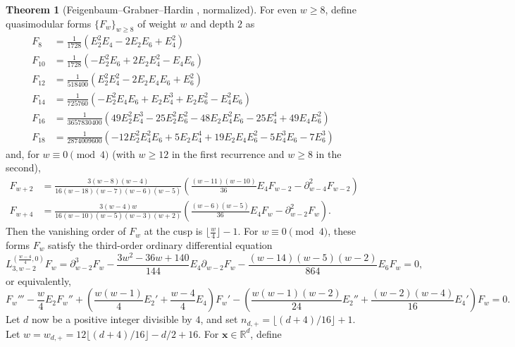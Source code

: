 \documentclass[10pt,reqno]{amsproc}
\newcommand{\1}{\mathds{1}}	%
\theoremstyle{definition}
\newtheorem{theorem}{Theorem}[section]
\theoremstyle{remark}
\begin{document}
\begin{theorem}[Feigenbaum--Grabner--Hardin \cite{feigenbaum2021eigenfunctions}, normalized]
\label{thm:fghposeig}
For even $w \geq 8$, define quasimodular forms $\{F_w\}_{w \geq 8}$ of weight $w$ and depth $2$ as
\begin{align*}
F_{8} &= \frac{1}{1728}(E_2^2 E_4 - 2E_2 E_6 + E_4^2) \\
F_{10} &= \frac{1}{1728}(- E_2^2 E_6 + 2 E_2 E_4^2 - E_4 E_6) \\
F_{12} &= \frac{1}{518400}(E_2^2 E_4^2 - 2 E_2 E_4 E_6 + E_6^2)\\
F_{14} &= \frac{1}{725760}(-E_2^2 E_4 E_6 + E_2 E_4^3 + E_2 E_6^2 - E_4^2 E_6)\\
F_{16} &= \frac{1}{3657830400}(49 E_2^2 E_4^3 - 25 E_2^2 E_6^2 - 48 E_2 E_4^2 E_6 - 25 E_4^4 + 49 E_4 E_6^2)\\
F_{18} &= \frac{1}{2874009600} (-12 E_2^2 E_4^2 E_6 + 5 E_2 E_4^4 + 19 E_2 E_4 E_6^2 - 5 E_4^3 E_6 - 7 E_6^3)
\end{align*}
and, for $w \equiv 0 \pmod{4}$ (with $w \geq 12$ in the first recurrence and $w \geq 8$ in the second),
\begin{align}
    F_{w + 2} &= \frac{3(w-8)(w-4)}{16(w-18)(w-7)(w-6)(w-5)} \left(\frac{(w-11)(w-10)}{36} E_{4} F_{w-2} - \partial_{w-4}^{2} F_{w-2}\right) \label{eqn:poseig2} \\
    F_{w + 4} &= \frac{3(w-4)w}{16(w-10)(w-5)(w-3)(w+2)} \left(\frac{(w-6)(w-5)}{36} E_{4} F_{w} - \partial_{w-2}^{2} F_{w} \right).\label{eqn:poseig4}
\end{align}
Then the vanishing order of $F_{w}$ at the cusp is $\lfloor \frac{w}{4}\rfloor - 1$.
For $w \equiv 0\pmod{4}$, these forms $F_w$ satisfy the third-order ordinary differential equation
\begin{equation}
    L_{3,w-2}^{(\frac{w-4}{4},0)} F_w = \partial_{w-2}^{3}F_w - \frac{3w^2 - 36w + 140}{144}E_4 \partial_{w-2}F_{w} - \frac{(w-14)(w-5)(w-2)}{864}E_6 F_w = 0, \label{eqn:poseigde}
\end{equation}
or equivalently,
\begin{equation}
    \label{eqn:poseigde2}
    F_w''' - \frac{w}{4} E_2 F_w'' + \left(\frac{w(w-1)}{4} E_2' + \frac{w-4}{4}E_4\right)F_w' - \left(\frac{w(w-1)(w-2)}{24} E_2'' + \frac{(w-2)(w-4)}{16} E_4'\right) F_w = 0.
\end{equation}
Let $d$ now be a positive integer divisible by $4$, and set $n_{d,+} = \lfloor (d + 4)/16\rfloor + 1$.
Let $w = w_{d, +} = 12 \lfloor (d+4) / 16\rfloor - d /2  + 16$.
For $\mathbf{x}\in\mathbb{R}^{d}$, define

\end{theorem}
\end{document}
